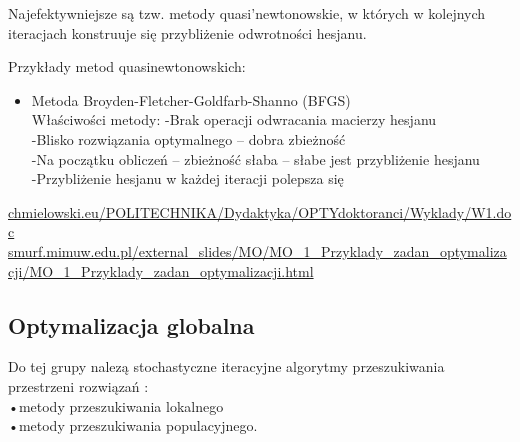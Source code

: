 \documentclass[a4paper,twoside]{report}
\begin{document}
		
		Najefektywniejsze są tzw. metody quasi'newtonowskie, w
		których w kolejnych iteracjach konstruuje się przybliżenie odwrotności hesjanu.  
		
		
		Przykłady metod quasinewtonowskich:
		\begin{itemize}
			\item Metoda Broyden-Fletcher-Goldfarb-Shanno (BFGS)\\
			Właściwości metody:
			-Brak operacji odwracania macierzy hesjanu\\
			-Blisko rozwiązania optymalnego – dobra zbieżność\\
			-Na początku obliczeń – zbieżność słaba – słabe jest przybliżenie hesjanu\\
			-Przybliżenie hesjanu w każdej iteracji polepsza się
		\end{itemize}
		
		
		\url{chmielowski.eu/POLITECHNIKA/Dydaktyka/OPTYdoktoranci/Wyklady/W1.doc}\\
		\url{smurf.mimuw.edu.pl/external_slides/MO/MO_1_Przyklady_zadan_optymalizacji/MO_1_Przyklady_zadan_optymalizacji.html}
		
		
		\subsection{Optymalizacja globalna}
		
		Do tej grupy nalezą stochastyczne iteracyjne algorytmy 
		przeszukiwania przestrzeni rozwiązań :\\
		•metody przeszukiwania lokalnego\\
		•metody przeszukiwania populacyjnego.\\
		
\end{document}
